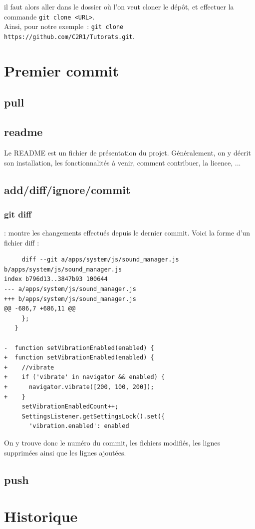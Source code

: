 \documentclass[a4paper,10pt]{report}
\begin{document}
il faut alors aller dans le dossier o\`u l'on veut cloner le d\'ep\^ot, et effectuer la commande \verb|git clone <URL>|.\\
Ainsi, pour notre exemple~: \verb|git clone https://github.com/C2R1/Tutorats.git|.

  \section{Premier commit}
     \subsection{pull}
     \subsection{readme}
     Le README est un fichier de présentation du projet. Généralement, on y décrit son installation, les fonctionnalités à venir, comment contribuer, la licence, ...
     \subsection{add/diff/ignore/commit}
\subsubsection{git diff} : montre les changements effectués depuis le dernier commit. Voici la forme d'un fichier diff :
\begin{verbatim}
     diff --git a/apps/system/js/sound_manager.js b/apps/system/js/sound_manager.js
index b796d13..3847b93 100644
--- a/apps/system/js/sound_manager.js
+++ b/apps/system/js/sound_manager.js
@@ -686,7 +686,11 @@
     };
   }
 
-  function setVibrationEnabled(enabled) {
+  function setVibrationEnabled(enabled) {    
+    //vibrate
+    if ('vibrate' in navigator && enabled) {
+      navigator.vibrate([200, 100, 200]);
+    }
     setVibrationEnabledCount++;
     SettingsListener.getSettingsLock().set({
       'vibration.enabled': enabled
\end{verbatim}   
     On y trouve donc le numéro du commit, les fichiers modifiés, les lignes supprimées ainsi que les lignes ajoutées.
     \subsection{push}
  \section{Historique}
\end{document}
